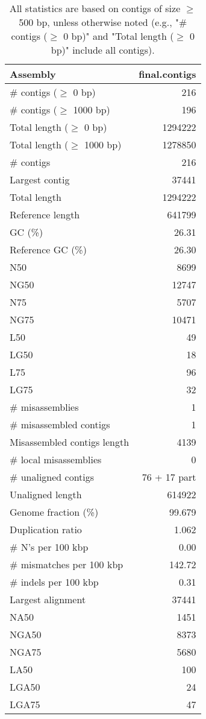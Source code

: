 \documentclass[12pt,a4paper]{article}
\begin{document}
\begin{table}[ht]
\begin{center}
\caption{All statistics are based on contigs of size $\geq$ 500 bp, unless otherwise noted (e.g., "\# contigs ($\geq$ 0 bp)" and "Total length ($\geq$ 0 bp)" include all contigs).}
\begin{tabular}{|l*{1}{|r}|}
\hline
Assembly & final.contigs \\ \hline
\# contigs ($\geq$ 0 bp) & 216 \\ \hline
\# contigs ($\geq$ 1000 bp) & 196 \\ \hline
Total length ($\geq$ 0 bp) & 1294222 \\ \hline
Total length ($\geq$ 1000 bp) & 1278850 \\ \hline
\# contigs & 216 \\ \hline
Largest contig & 37441 \\ \hline
Total length & 1294222 \\ \hline
Reference length & 641799 \\ \hline
GC (\%) & 26.31 \\ \hline
Reference GC (\%) & 26.30 \\ \hline
N50 & 8699 \\ \hline
NG50 & 12747 \\ \hline
N75 & 5707 \\ \hline
NG75 & 10471 \\ \hline
L50 & 49 \\ \hline
LG50 & 18 \\ \hline
L75 & 96 \\ \hline
LG75 & 32 \\ \hline
\# misassemblies & 1 \\ \hline
\# misassembled contigs & 1 \\ \hline
Misassembled contigs length & 4139 \\ \hline
\# local misassemblies & 0 \\ \hline
\# unaligned contigs & 76 + 17 part \\ \hline
Unaligned length & 614922 \\ \hline
Genome fraction (\%) & 99.679 \\ \hline
Duplication ratio & 1.062 \\ \hline
\# N's per 100 kbp & 0.00 \\ \hline
\# mismatches per 100 kbp & 142.72 \\ \hline
\# indels per 100 kbp & 0.31 \\ \hline
Largest alignment & 37441 \\ \hline
NA50 & 1451 \\ \hline
NGA50 & 8373 \\ \hline
NGA75 & 5680 \\ \hline
LA50 & 100 \\ \hline
LGA50 & 24 \\ \hline
LGA75 & 47 \\ \hline
\end{tabular}
\end{center}
\end{table}
\end{document}
